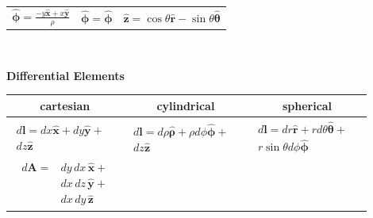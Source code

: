 \documentclass[letterpaper,landscape,10pt]{article}
\begin{document}
{\begin{multicols}{4}
\begin{center}
\begin{minipage}{\columnwidth}
\begin{tabular}{ @{}c@{} !{\color{black}\vline} c !{\color{black}\vline} @{}c@{} }
		$ \bm{\hat{\phi}} = \frac{-y\bm{\hat{x}} + x\bm{\hat{y}}}{\rho} $ &
		$ \bm{\hat{\phi}} = \bm{\hat{\phi}} $ &
		$ \bm{\hat{z}} = \cos\theta\bm{\hat{r}} - \sin\theta\bm{\hat{\theta}}$\\
		
	\end{tabular}\\
	\end{minipage}
	\end{center}
	
	\begin{center}
	  \begin{minipage}{\columnwidth}
		\centering \textbf{Differential Elements}\\
		\vspace{2.5pt}
		\begin{tabular}{ @{}c@{} !{\color{black}\vline} c !{\color{black}\vline} @{}c@{} }
			\textbf{cartesian} & \textbf{cylindrical} & \textbf{spherical} \\
			\hline

			\parbox[h][][t]{.290\columnwidth}{
				\begin{equation*}\begin{split}
					d\bm{\bm{l}} = dx\bm{\hat{x}} + dy\bm{\hat{y}} +& \\
						dz\bm{\hat{z}}
				\end{split}\end{equation*} } &

			\parbox[h][][t]{.295\columnwidth}{
				\begin{equation*}\begin{split}
					d\bm{\bm{l}} = d\rho\bm{\hat{\rho}} +
						\rho d\phi\bm{\hat{\phi}} +& \\
						dz\bm{\hat{z}}
				\end{split}\end{equation*} } &

			\parbox[h][][t]{.335\columnwidth}{
				\begin{equation*}\begin{split}
					d\bm{\bm{l}} = dr\bm{\hat{r}} +
						rd\theta\bm{\hat{\theta}} + & \\
						r\sin\theta d\phi\bm{\hat{\phi}}
				\end{split}\end{equation*} } \\

			\hline

			\parbox[h][][t]{.290\columnwidth}{
				\begin{equation*}\begin{split}
					d\bm{\bm{A}} =& dy\, dx\, \bm{\hat{x}} + \\
						&dx\, dz\, \bm{\hat{y}} + \\
						&dx\, dy\, \bm{\hat{z}}
				\end{split}\end{equation*} } &


\end{tabular}
\end{minipage}
\end{center}
\end{multicols}}
\end{document}
